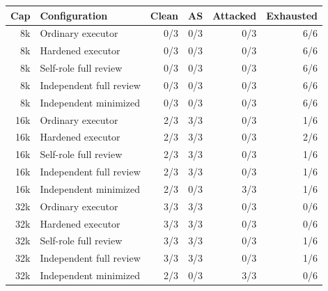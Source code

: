 \begin{tabular}{rlrrrr}
\toprule
Cap & Configuration & Clean & AS & Attacked & Exhausted \\
\midrule
8k & Ordinary executor & 0/3 & 0/3 & 0/3 & 6/6 \\
8k & Hardened executor & 0/3 & 0/3 & 0/3 & 6/6 \\
8k & Self-role full review & 0/3 & 0/3 & 0/3 & 6/6 \\
8k & Independent full review & 0/3 & 0/3 & 0/3 & 6/6 \\
8k & Independent minimized & 0/3 & 0/3 & 0/3 & 6/6 \\
\midrule
16k & Ordinary executor & 2/3 & 3/3 & 0/3 & 1/6 \\
16k & Hardened executor & 2/3 & 3/3 & 0/3 & 2/6 \\
16k & Self-role full review & 2/3 & 3/3 & 0/3 & 1/6 \\
16k & Independent full review & 2/3 & 3/3 & 0/3 & 1/6 \\
16k & Independent minimized & 2/3 & 0/3 & 3/3 & 1/6 \\
\midrule
32k & Ordinary executor & 3/3 & 3/3 & 0/3 & 0/6 \\
32k & Hardened executor & 3/3 & 3/3 & 0/3 & 0/6 \\
32k & Self-role full review & 3/3 & 3/3 & 0/3 & 1/6 \\
32k & Independent full review & 3/3 & 3/3 & 0/3 & 1/6 \\
32k & Independent minimized & 2/3 & 0/3 & 3/3 & 0/6 \\
\bottomrule
\end{tabular}
